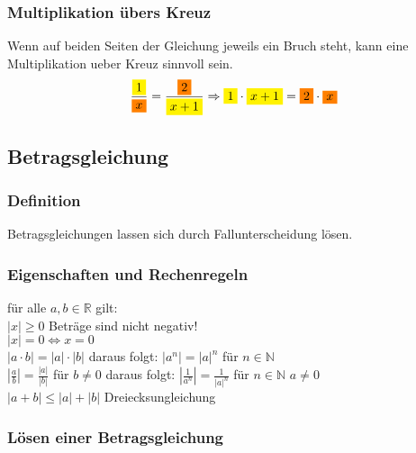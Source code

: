 \begin{multicols}{2}
    \subsubsection{Multiplikation übers Kreuz}
    \vspace{-4mm}
    Wenn auf beiden Seiten der Gleichung jeweils ein Bruch steht, kann eine Multiplikation ueber Kreuz sinnvoll sein.
    \[\frac{{\colorbox{yellow}{$1$}}}{{\colorbox{orange}{$x$}}} = \frac{{\colorbox{orange}{$2$}}}{{\colorbox{yellow}{$x+1$}}} \Rightarrow {\colorbox{yellow}{$1$}} \cdot {\colorbox{yellow}{$x+1$}} = {\colorbox{orange}{$2$}} \cdot {\colorbox{orange}{$x$}}\]


    \subsection{Betragsgleichung}
    \vspace{-4mm}
    \subsubsection{Definition}
    \vspace{-4mm}
    Betragsgleichungen lassen sich durch Fallunterscheidung lösen.

    \subsubsection{Eigenschaften und Rechenregeln}
    \vspace{-4mm}
    für alle $a, b \in \mathbb{R}$ gilt: \\
    $|x| \geq 0$ Beträge sind nicht negativ! \\
    $|x| = 0 \Leftrightarrow x = 0$ \\
    $|a \cdot b| = |a| \cdot |b|$ daraus folgt: $|a^n| = |a|^n$ für $n \in \mathbb{N}$ \\
    $|\frac{a}{b}| = \frac{|a|}{|b|}$ für $b \neq 0$  daraus folgt: $|\frac{1}{a^n}| = \frac{1}{|a|^n}$ für $n \in \mathbb{N}$ $a \neq 0$ \\
    $ |a+b| \leq |a| + |b|$ Dreiecksungleichung

    \subsubsection{Lösen einer Betragsgleichung}
    \vspace{-4mm}


\end{multicols}
